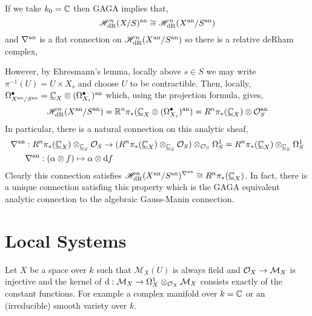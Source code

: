 \documentclass[12pt]{article}
\begin{document}
\begin{remark}
If we take $k_0 = \mathbb{C}$ then GAGA implies that,
\[ \mathscr{H}^n_{\mathrm{dR}}(X / S)^{\mathrm{an}} \cong \mathscr{H}^n_{\mathrm{dR}}(X^{\mathrm{an}} / S^{\mathrm{an}}) \]
and $\nabla^{\mathrm{an}}$ is a flat connection on $\mathscr{H}^n_{\mathrm{dR}}(X^{\mathrm{an}} / S^{\mathrm{an}})$ so there is a relative deRham complex,
\begin{center}
\end{center}
However, by Ehresmann's lemma, locally above $s \in S$ we may write $\pi^{-1}(U) = U \times X_s$ and choose $U$ to be contractible. Then, locally, $\Omega^\bullet_{X^{\mathrm{an}} / S^{\mathrm{an}}} = \underline{\mathbb{C}}_X \otimes (\Omega^\bullet_{X_s})^{\mathrm{an}}$ which, using the projection formula, gives,
\[ \mathscr{H}^n_{\mathrm{dR}}(X^{\mathrm{an}} / S^{\mathrm{an}}) = \mathbb{R}^n \pi_* (\underline{\mathbb{C}}_X \otimes (\Omega^\bullet_{X_s})^{\mathrm{an}}) = R^n \pi_*(\underline{\mathbb{C}}_X) \otimes \mathcal{O}_{S}^{\mathrm{an}} \] 
In particular, there is a natural connection on this analytic sheaf,
\begin{align*}
\nabla^{\mathrm{an}} & : R^n \pi_*(\underline{\mathbb{C}}_X) \otimes_{\underline{\mathbb{C}}_S} \mathcal{O}_{S} \to (R^n \pi_*(\underline{\mathbb{C}}_X) \otimes_{\underline{\mathbb{C}}_S} \mathcal{O}_{S}) \otimes_{\mathcal{O}_{S}} \Omega^1_S = R^n \pi_*(\underline{\mathbb{C}}_X) \otimes_{\underline{\mathbb{C}}_S} \Omega^1_S
\\
& \nabla^{\mathrm{an}} : (\alpha \otimes f) \mapsto \alpha \otimes \mathrm{d}{f} 
\end{align*}
Clearly this connection satisfies $\mathscr{H}^n_{\mathrm{dR}}(X^{\mathrm{an}} / S^{\mathrm{an}})^{\nabla^{\mathrm{an}}} \cong R^n \pi_*(\underline{\mathbb{C}}_X)$. In fact, there is a unique connection satisfing this property which is the GAGA equivalent analytic connection to the algebraic Gauss-Manin connection.
\end{remark}


\section{Local Systems}

\newcommand{\M}{\mathcal{M}}

\begin{rmk}
Let $X$ be a space over $k$ such that $\M_X(U)$ is always field and $\struct{X} \to \M_X$ is injective and the kernel of $\d : \M_X \to \Omega^1_X \otimes_{\struct{X}} \M_X$ consists exactly of the constant functions. For example a complex manifold over $k = \mathbb{C}$ or an (irreducible) smooth variety over $k$.
\end{rmk}
\end{document}
